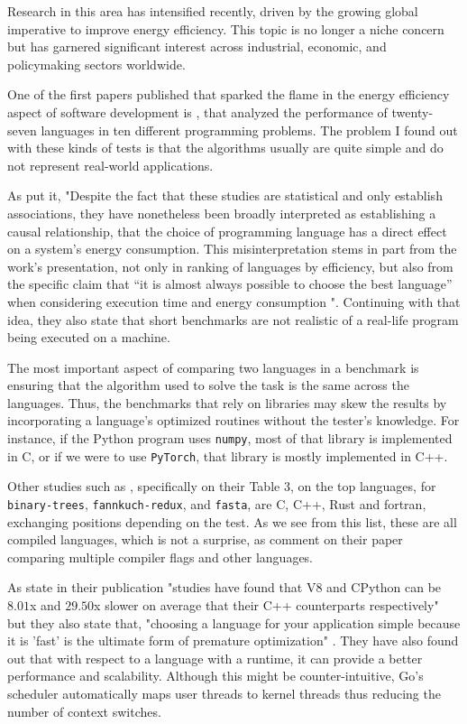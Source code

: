 Research in this area has intensified recently, driven by the growing global imperative to improve energy efficiency. This topic is no longer a niche concern but has garnered significant interest across industrial, economic, and policymaking sectors worldwide.

One of the first papers published that sparked the flame in the energy efficiency aspect of software development is \textcite{energy-efficiency-rui-v1}, that analyzed the performance of twenty-seven languages in ten different programming problems. The problem I found out with these kinds of tests is that the algorithms usually are quite simple and do not represent real-world applications. 

As \textcite{vankempen2025itseasygreenenergy} put it, "Despite the fact that these studies are statistical and only establish associations, they have nonetheless been broadly interpreted as establishing a causal relationship, that the choice of programming language has a direct effect on a system’s energy consumption. This misinterpretation stems in part from the work’s presentation, not only in ranking of languages by efficiency, but also from the specific claim that “it is almost always possible to choose the best language” when considering execution time and energy consumption \cite{ranking-rui-pereira}". Continuing with that idea, they also state that short benchmarks are not realistic of a real-life program being executed on a machine.

The most important aspect of comparing two languages in a benchmark is ensuring that the algorithm used to solve the task is the same across the languages. Thus, the benchmarks that rely on libraries may skew the results by incorporating a language's optimized routines without the tester's knowledge. For instance, if the Python program uses \texttt{\gls{numpy}}, most of that library is implemented in C, or if we were to use \texttt{\gls{PyTorch}}, that library is mostly implemented in C++.

Other studies such as \cite{ranking-rui-pereira}, specifically on their Table 3, on the top languages, for \texttt{binary-trees}, \texttt{fannkuch-redux}, and \texttt{fasta}, are C, C++, Rust and \gls{fortran}, exchanging positions depending on the test. As we see from this list, these are all compiled languages, which is not a surprise, as \textcite{imact-compiler} comment on their paper comparing multiple compiler flags and other languages. 

As \textcite{usenix-comparing-29x} state in their publication "studies have found that \gls{V8} and \gls{CPython} can be $8.01$x and $29.50$x slower on average that their C++ counterparts respectively" but they also state that, "choosing a language for your application simple because it is 'fast' is the ultimate form of premature optimization" \cite{python-is-slow}. They have also found out that with respect to a language with a runtime, it can provide a better performance and scalability. Although this might be counter-intuitive, Go's scheduler automatically maps user threads to kernel threads thus reducing the number of context switches.

